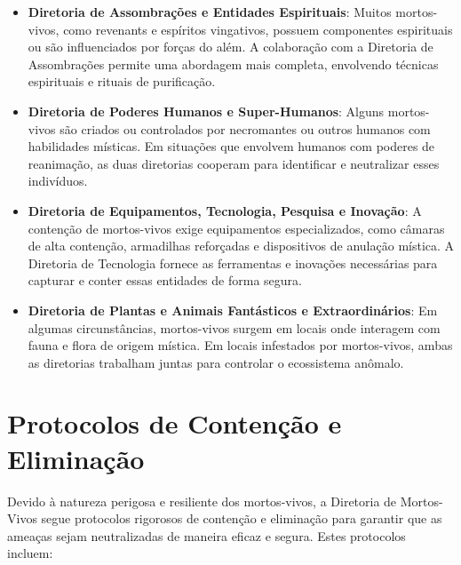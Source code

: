 \begin{itemize}
    \item \textbf{Diretoria de Assombrações e Entidades Espirituais}: Muitos mortos-vivos, como revenants e espíritos vingativos, possuem componentes espirituais ou são influenciados por forças do além. A colaboração com a Diretoria de Assombrações permite uma abordagem mais completa, envolvendo técnicas espirituais e rituais de purificação.
    \item \textbf{Diretoria de Poderes Humanos e Super-Humanos}: Alguns mortos-vivos são criados ou controlados por necromantes ou outros humanos com habilidades místicas. Em situações que envolvem humanos com poderes de reanimação, as duas diretorias cooperam para identificar e neutralizar esses indivíduos.
    \item \textbf{Diretoria de Equipamentos, Tecnologia, Pesquisa e Inovação}: A contenção de mortos-vivos exige equipamentos especializados, como câmaras de alta contenção, armadilhas reforçadas e dispositivos de anulação mística. A Diretoria de Tecnologia fornece as ferramentas e inovações necessárias para capturar e conter essas entidades de forma segura.
    \item \textbf{Diretoria de Plantas e Animais Fantásticos e Extraordinários}: Em algumas circunstâncias, mortos-vivos surgem em locais onde interagem com fauna e flora de origem mística. Em locais infestados por mortos-vivos, ambas as diretorias trabalham juntas para controlar o ecossistema anômalo.
\end{itemize}

\section{Protocolos de Contenção e Eliminação}
Devido à natureza perigosa e resiliente dos mortos-vivos, a Diretoria de Mortos-Vivos segue protocolos rigorosos de contenção e eliminação para garantir que as ameaças sejam neutralizadas de maneira eficaz e segura. Estes protocolos incluem:

